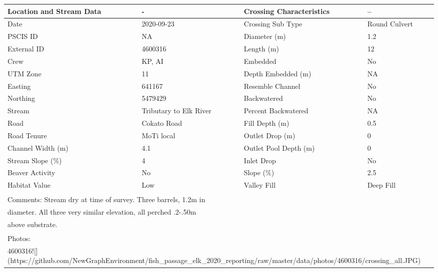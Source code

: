 \documentclass[
]{book}
\begin{document}
\begin{tabular}{l|l|l|l}
\hline
Location and Stream Data & - & Crossing Characteristics & --\\
\hline
Date & 2020-09-23 & Crossing Sub Type & Round Culvert\\
\hline
PSCIS ID & NA & Diameter (m) & 1.2\\
\hline
External ID & 4600316 & Length (m) & 12\\
\hline
Crew & KP, AI & Embedded & No\\
\hline
UTM Zone & 11 & Depth Embedded (m) & NA\\
\hline
Easting & 641167 & Resemble Channel & No\\
\hline
Northing & 5479429 & Backwatered & No\\
\hline
Stream & Tributary to Elk River & Percent Backwatered & NA\\
\hline
Road & Cokato Road & Fill Depth (m) & 0.5\\
\hline
Road Tenure & MoTi local & Outlet Drop (m) & 0\\
\hline
Channel Width (m) & 4.1 & Outlet Pool Depth (m) & 0\\
\hline
Stream Slope (\%) & 4 & Inlet Drop & No\\
\hline
Beaver Activity & No & Slope (\%) & 2.5\\
\hline
Habitat Value & Low & Valley Fill & Deep Fill\\
\hline
\multicolumn{4}{l}{\textsuperscript{} Comments: Stream dry at time of survey. Three barrels, 1.2m in}\\
\multicolumn{4}{l}{diameter. All three very similar elevation, all perched .2-.50m}\\
\multicolumn{4}{l}{above substrate.}\\
\multicolumn{4}{l}{\textsuperscript{} Photos:}\\
\multicolumn{4}{l}{4600316![](https://github.com/NewGraphEnvironment/fish\_passage\_elk\_2020\_reporting/raw/master/data/photos/4600316/crossing\_all.JPG)}\\
\end{tabular}
\end{document}
